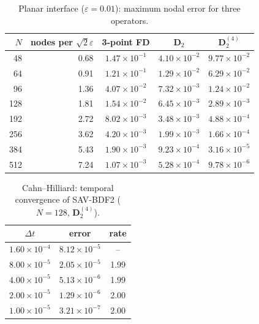 \documentclass[11pt]{article}
\begin{document}
\begin{table}[htbp]\centering\small
\caption{Planar interface ($\varepsilon=0.01$): maximum nodal error for three operators.}
\begin{tabular}{rr ccc}
\toprule
$N$ & nodes per $\sqrt2\varepsilon$ & 3-point FD & $\mathbf D_2$ & $\mathbf D_2^{(4)}$\\
\midrule
48 & 0.68 & $1.47{\times}10^{-1}$ & $4.10{\times}10^{-2}$ & $9.77{\times}10^{-2}$\\
64 & 0.91 & $1.21{\times}10^{-1}$ & $1.29{\times}10^{-2}$ & $6.29{\times}10^{-2}$\\
96 & 1.36 & $4.07{\times}10^{-2}$ & $7.32{\times}10^{-3}$ & $1.24{\times}10^{-2}$\\
128 & 1.81 & $1.54{\times}10^{-2}$ & $6.45{\times}10^{-3}$ & $2.89{\times}10^{-3}$\\
192 & 2.72 & $8.02{\times}10^{-3}$ & $3.48{\times}10^{-3}$ & $4.88{\times}10^{-4}$\\
256 & 3.62 & $4.20{\times}10^{-3}$ & $1.99{\times}10^{-3}$ & $1.66{\times}10^{-4}$\\
384 & 5.43 & $1.90{\times}10^{-3}$ & $9.23{\times}10^{-4}$ & $3.16{\times}10^{-5}$\\
512 & 7.24 & $1.07{\times}10^{-3}$ & $5.28{\times}10^{-4}$ & $9.78{\times}10^{-6}$\\
\bottomrule
\end{tabular}
\end{table}

\begin{table}[htbp]\centering\small
\caption{Cahn--Hilliard: temporal convergence of SAV-BDF2 ($N=128$, $\mathbf D_2^{(4)}$).}
\begin{tabular}{c cc}
\toprule
$\Delta t$ & error & rate\\
\midrule
$1.60{\times}10^{-4}$ & $8.12{\times}10^{-5}$ & --\\
$8.00{\times}10^{-5}$ & $2.05{\times}10^{-5}$ & 1.99\\
$4.00{\times}10^{-5}$ & $5.13{\times}10^{-6}$ & 1.99\\
$2.00{\times}10^{-5}$ & $1.29{\times}10^{-6}$ & 2.00\\
$1.00{\times}10^{-5}$ & $3.21{\times}10^{-7}$ & 2.00\\
\bottomrule
\end{tabular}
\end{table}
\end{document}
